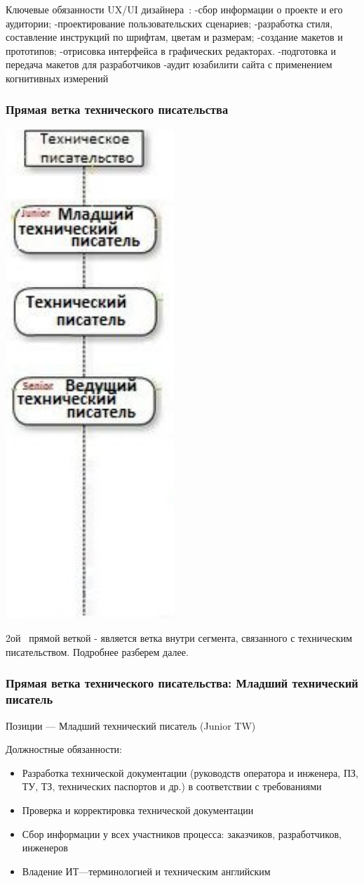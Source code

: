 \documentclass{../industrial-development}
\begin{document}
{\lecturenotes
Ключевые обязанности UX/UI дизайнера~\cite{rab}:
-сбор информации о проекте и его аудитории;
-проектирование пользовательских сценариев;
-разработка стиля, составление инструкций по шрифтам, цветам и размерам;
-создание макетов и прототипов;
-отрисовка интерфейса в графических редакторах.
-подготовка и передача макетов для разработчиков
-аудит юзабилити сайта с применением когнитивных измерений


\begin{frame} \frametitle{Прямая ветка технического писательства }
  \centerline{\includegraphics[width=0.27\linewidth]{11-IT-specialist's-way/sch12b.pdf}}
\end{frame}

\lecturenotes
 2ой~\cite{mc} прямой веткой  - является ветка внутри сегмента, связанного с техническим писательством. Подробнее разберем далее.


\begin{frame} \frametitle{Прямая ветка технического писательства: Младший технический писатель }
  \begin{block}{}
  \alert{Позиции --- Младший технический писатель (Junior TW) }

Должностные обязанности: 
  \end{block}
  \begin{itemize}
  \item  Разработка технической документации (руководств оператора и инженера, ПЗ, ТУ, ТЗ, технических паспортов и др.) в соответствии с требованиями
  \item  Проверка и корректировка технической документации
  \item Сбор информации у всех участников процесса: заказчиков, разработчиков, инженеров
 \item Владение ИТ---терминологией и техническим английским
  \end{itemize}
\end{frame}


}
\end{document}
